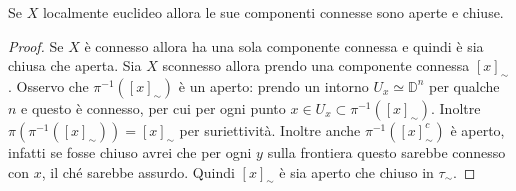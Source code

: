 \begin{theorem}
	Se $X$ localmente euclideo allora le sue componenti connesse sono aperte e chiuse.
\end{theorem}
\begin{proof}
	Se $X$ è connesso allora ha una sola componente connessa e quindi è sia chiusa che aperta.
	Sia $X$ sconnesso allora prendo una componente connessa $\left[x\right]_\sim$. Osservo che $\pi^{-1}(\left[x\right]_\sim)$ è un aperto: prendo un intorno $U_x \simeq \mathbb{D}^n$ per qualche $n$ e questo è connesso, per cui per ogni punto $x \in U_x \subset \pi^{-1}(\left[x\right]_\sim)$. Inoltre $\pi(\pi^{-1}(\left[x\right]_\sim)) = \left[x\right]_\sim$ per suriettività. Inoltre anche $\pi^{-1}(\left[x\right]^c_\sim)$ è aperto, infatti se fosse chiuso avrei che per ogni $y$ sulla frontiera questo sarebbe connesso con $x$, il ché sarebbe assurdo. Quindi $\left[x\right]_\sim$ è sia aperto che chiuso in $\tau_\sim$.
\end{proof}

